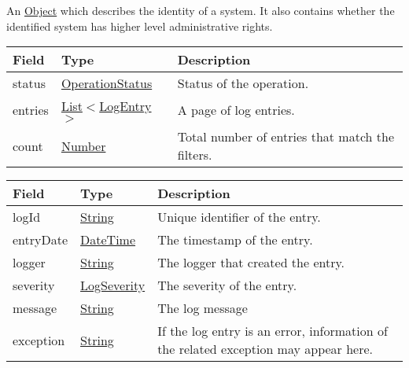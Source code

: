 \documentclass[a4paper]{arrowhead}
\newcommand{\pref}[1]{{\textcolor{ArrowheadGrey}{\hyperref[sec:model:primitives:#1]{#1}}}}
\begin{document}
\label{sec:model:Identity}

An \pref{Object} which describes the identity of a system. It also contains whether the identified system has higher level administrative rights.

\label{sec:model:LogResponse}

\begin{table}[ht!]
\begin{tabularx}{\textwidth}{| p{3cm} | p{6cm} | X |} \hline
\rowcolor{gray!33} Field & Type      & Description \\ \hline
status & \pref{OperationStatus} & Status of the operation. \\ \hline
entries & \pref{List}$<$\hyperref[sec:model:LogEntry]{LogEntry}$>$ & A page of log entries. \\ \hline
count & \pref{Number} & Total number of entries that match the filters. \\ \hline
\end{tabularx}
\end{table}

\clearpage

\label{sec:model:LogEntry}
 
\begin{table}[ht!]
\begin{tabularx}{\textwidth}{| p{4.25cm} | p{4cm} | X |} \hline
\rowcolor{gray!33} Field & Type      & Description \\ \hline
logId & \pref{String} & Unique identifier of the entry. \\ \hline
entryDate & \pref{DateTime} & The timestamp of the entry. \\ \hline
logger & \pref{String} & The logger that created the entry. \\ \hline
severity & \pref{LogSeverity} & The severity of the entry. \\ \hline
message & \pref{String} & The log message \\ \hline
exception & \pref{String} & If the log entry is an error, information of the related exception may appear here. \\ \hline
\end{tabularx}
\end{table}

\label{sec:model:ErrorResponse}
\end{document}
